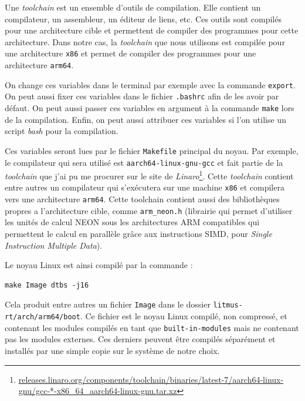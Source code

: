 Une \textit{toolchain} est un ensemble d'outils de compilation. Elle contient un compilateur, un assembleur, un éditeur de liens, etc. Ces outils sont compilés pour une architecture cible et permettent de compiler des programmes pour cette architecture. Dans notre cas, la \textit{toolchain} que nous utilisons est compilée pour une architecture \texttt{x86} et permet de compiler des programmes pour une architecture \texttt{arm64}.


On change ces variables dans le terminal par exemple avec la commande \texttt{export}. On peut aussi fixer ces variables dans le fichier \texttt{.bashrc} afin de les avoir par défaut. On peut aussi passer ces variables en argument à la commande \texttt{make} lors de la compilation. Enfin, on peut aussi attribuer ces variables si l'on utilise un script \textit{bash} pour la compilation. 

Ces variables seront lues par le fichier \texttt{Makefile} principal du noyau. Par exemple, le compilateur qui sera utilisé est \texttt{aarch64-linux-gnu-gcc} et fait partie de la \textit{toolchain} que j'ai pu me procurer sur le site de \textit{Linaro}\footnote{\href{https://releases.linaro.org/components/toolchain/binaries/latest-7/aarch64-linux-gnu/gcc-*-x86\_64\_aarch64-linux-gnu.tar.xz}{releases.linaro.org/components/toolchain/binaries/latest-7/aarch64-linux-gnu/gcc-*-x86\_64\_aarch64-linux-gnu.tar.xz}}.
Cette \textit{toolchain} contient entre autres un compilateur qui s'exécutera sur une machine \texttt{x86} et compilera vers une architecture \texttt{arm64}. Cette toolchain contient aussi des bibliothèques propres a l'architecture cible, comme \texttt{arm\_neon.h} (librairie qui permet d'utiliser les unités de calcul NEON sous les architectures ARM compatibles qui permettent le calcul en parallèle grâce aux instructions SIMD, pour \textit{Single Instruction Multiple Data}).

Le noyau Linux est ainsi compilé par la commande :
\begin{lstlisting}[style=command, caption=Compilation croisée du noyau Linux]
    make Image dtbs -j16
\end{lstlisting}
Cela produit entre autres un fichier \texttt{Image} dans le dossier \texttt{litmus-rt/arch/arm64/boot}. Ce fichier est le noyau Linux compilé, non compressé, et contenant les modules compilés en tant que \texttt{built-in-modules} mais ne contenant pas les modules externes. Ces derniers peuvent être compilés séparément et installés par une simple copie sur le système de notre choix. 

